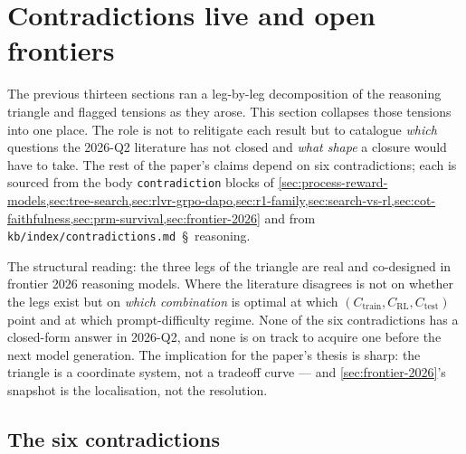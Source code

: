 
\section{Contradictions live and open frontiers}
\label{sec:contradictions}

The previous thirteen sections ran a leg-by-leg decomposition of the
reasoning triangle and flagged tensions as they arose. This section
collapses those tensions into one place. The role is not to relitigate
each result but to catalogue \emph{which} questions the 2026-Q2
literature has not closed and \emph{what shape} a closure would have
to take. The rest of the paper's claims depend on
six contradictions; each is sourced from the body
\texttt{contradiction} blocks of \cref{sec:process-reward-models,sec:tree-search,sec:rlvr-grpo-dapo,sec:r1-family,sec:search-vs-rl,sec:cot-faithfulness,sec:prm-survival,sec:frontier-2026}
and from \texttt{kb/index/contradictions.md}~\S~reasoning.

The structural reading: the three legs of the triangle are real and
co-designed in frontier 2026 reasoning models. Where the literature
disagrees is not on whether the legs exist but on \emph{which
combination} is optimal at which $(C_\text{train}, C_\text{RL},
C_\text{test})$ point and at which prompt-difficulty regime. None of
the six contradictions has a closed-form answer in 2026-Q2, and none
is on track to acquire one before the next model generation. The
implication for the paper's thesis is sharp: the triangle is a
coordinate system, not a tradeoff curve --- and \cref{sec:frontier-2026}'s
snapshot is the localisation, not the resolution.

\subsection{The six contradictions}
\label{sec:contradictions-six}

